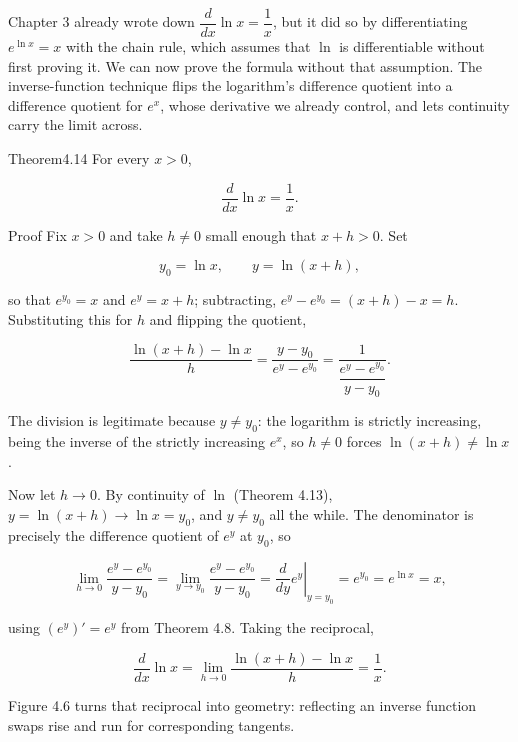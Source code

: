 \documentclass[a4paper,12pt,oneside]{memoir}
\begin{document}
Chapter 3 already wrote down \(\dfrac{d}{dx}\ln x = \dfrac{1}{x}\), but it did so by differentiating \(e^{\ln x} = x\) with the chain rule, which assumes that \(\ln\) is differentiable without first proving it. We can now prove the formula without that assumption. The inverse-function technique flips the logarithm’s difference quotient into a difference quotient for \(e^{x}\), whose derivative we already control, and lets continuity carry the limit across.

\begin{envtheorem}{Theorem}{4.14}{}
For every \(x > 0\),

\[ \frac{d}{dx}\ln x = \frac{1}{x}. \]
\end{envtheorem}
\begin{envproof}{Proof}{}{}
Fix \(x > 0\) and take \(h \ne 0\) small enough that \(x + h > 0\). Set

\[ y_{0} = \ln x, \qquad y = \ln(x + h), \]

so that \(e^{y_{0}} = x\) and \(e^{y} = x + h\); subtracting, \(e^{y} - e^{y_{0}} = (x + h) - x = h\). Substituting this for \(h\) and flipping the quotient,

\[ \frac{\ln(x + h) - \ln x}{h} = \frac{y - y_{0}}{e^{y} - e^{y_{0}}} = \frac{1}{\dfrac{e^{y} - e^{y_{0}}}{y - y_{0}}}. \]

The division is legitimate because \(y \ne y_{0}\): the logarithm is strictly increasing, being the inverse of the strictly increasing \(e^{x}\), so \(h \ne 0\) forces \(\ln(x + h) \ne \ln x\).

Now let \(h \to 0\). By continuity of \(\ln\) (Theorem 4.13), \(y = \ln(x + h) \to \ln x = y_{0}\), and \(y \ne y_{0}\) all the while. The denominator is precisely the difference quotient of \(e^{y}\) at \(y_{0}\), so

\[ \lim_{h \to 0} \frac{e^{y} - e^{y_{0}}}{y - y_{0}} = \lim_{y \to y_{0}} \frac{e^{y} - e^{y_{0}}}{y - y_{0}} = \left.\frac{d}{dy} e^{y}\right|_{y = y_{0}} = e^{y_{0}} = e^{\ln x} = x, \]

using \((e^{y})' = e^{y}\) from Theorem 4.8. Taking the reciprocal,

\[ \frac{d}{dx}\ln x = \lim_{h \to 0} \frac{\ln(x + h) - \ln x}{h} = \frac{1}{x}. \]

\qedmark
\end{envproof}
Figure 4.6 turns that reciprocal into geometry: reflecting an inverse function swaps rise and run for corresponding tangents.
\end{document}
